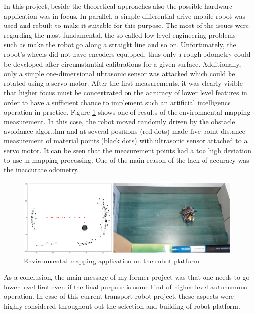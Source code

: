 \documentclass[12pt,english,twoside]{article}
\begin{document}
In this project, beside the theoretical approaches also the possible hardware application was in focus. In parallel, a simple differential drive mobile robot was used and rebuilt to make it suitable for this purpose. The most of the issues were regarding the most fundamental, the so called low-level engineering problems such as make the robot go along a straight line and so on. Unfortunately, the robot's wheels did not have encoders equipped, thus only a rough odometry could be developed after circumstantial calibrations for a given surface. Additionally, only a simple one-dimensional ultrasonic sensor was attached which could be rotated using a servo motor. After the first measurements, it was clearly visible that higher focus must be concentrated on the accuracy of lower level features in order to have a sufficient chance to implement such an artificial intelligence operation in practice. Figure \ref{glimpse2} shows one of results of the environmental mapping measurement. In this case, the robot moved randomly driven by the obstacle avoidance algorithm and at several positions (red dots) made five-point distance measurement of material points (black dots) with ultrasonic sensor attached to a servo motor. It can be seen that the measurement points had a too high deviation to use in mapping processing. One of the main reason of the lack of accuracy was the inaccurate odometry.
\begin{figure}[h]
	\centering
	\includegraphics[width=\textwidth]{figures/glimpse2.png}
	\caption{Environmental mapping application on the robot platform}
	\label{glimpse2}
\end{figure}

As a conclusion, the main message of my former project was that one needs to go lower level first even if the final purpose is some kind of higher level autonomous operation. In case of this current transport robot project, these aspects were highly considered throughout out the selection and building of robot platform.


\newpage

\end{document}

